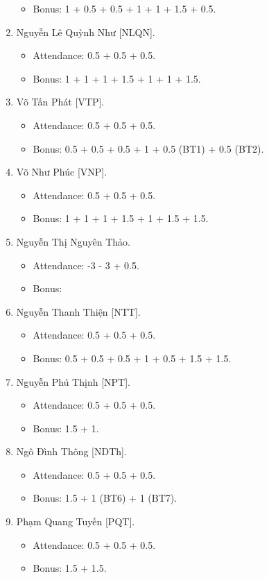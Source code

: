 \documentclass{article}
\begin{document}
\begin{enumerate}
\begin{itemize}
        \item Bonus: 1 + 0.5 + 0.5 + 1 + 1 + 1.5 + 0.5.
    \end{itemize}
    \item {\sc Nguyễn Lê Quỳnh Như [NLQN].}
    \begin{itemize}
        \item Attendance: 0.5 + 0.5 + 0.5.
        \item Bonus: 1 + 1 + 1 + 1.5 + 1 + 1 + 1.5.
    \end{itemize}
    \item {\sc Võ Tấn Phát [VTP].}
    \begin{itemize}
        \item Attendance: 0.5 + 0.5 + 0.5.
        \item Bonus: 0.5 + 0.5 + 0.5 + 1 + 0.5 (BT1) + 0.5 (BT2).
    \end{itemize}
    \item {\sc Võ Như Phúc [VNP].}
    \begin{itemize}
        \item Attendance: 0.5 + 0.5 + 0.5.
        \item Bonus: 1 + 1 + 1 + 1.5 + 1 + 1.5 + 1.5.
    \end{itemize}
    \item {\sc Nguyễn Thị Nguyên Thảo.}
    \begin{itemize}
        \item Attendance: -3 - 3 + 0.5.
        \item Bonus:
    \end{itemize}
    \item {\sc Nguyễn Thanh Thiện [NTT].}
    \begin{itemize}
        \item Attendance: 0.5 + 0.5 + 0.5.
        \item Bonus: 0.5 + 0.5 + 0.5 + 1 + 0.5 + 1.5 + 1.5.
    \end{itemize}
    \item {\sc Nguyễn Phú Thịnh [NPT].}
    \begin{itemize}
        \item Attendance: 0.5 + 0.5 + 0.5.
        \item Bonus: 1.5 + 1.
    \end{itemize}
    \item {\sc Ngô Đình Thông [NDTh].}
    \begin{itemize}
        \item Attendance: 0.5 + 0.5 + 0.5.
        \item Bonus: 1.5 + 1 (BT6) + 1 (BT7).
    \end{itemize}
    \item {\sc Phạm Quang Tuyến [PQT].}
    \begin{itemize}
        \item Attendance: 0.5 + 0.5 + 0.5.
        \item Bonus: 1.5 + 1.5.
    \end{itemize}
\end{enumerate}
\end{document}
